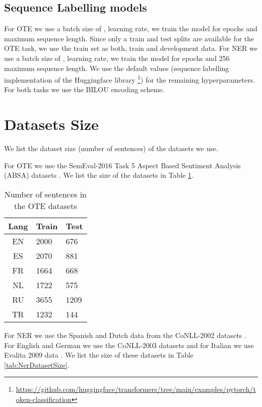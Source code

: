 \documentclass[11pt]{article}
\begin{document}
\subsection{Sequence Labelling models}\label{sec:appendix-models}
For OTE we use a batch size of ,  learning rate, we train the model for  epochs and  maximum sequence length. Since only a train and test splits are available for the OTE task, we use the train set as both, train and development data. 
For NER we use a batch size of ,  learning rate, we train the model for  epochs and 256 maximum sequence length. We use the default values (sequence labelling implementation of the Huggingface library \footnote{\url{https://github.com/huggingface/transformers/tree/main/examples/pytorch/token-classification}}) for the remaining hyperparameters. 
For both tasks we use the BILOU encoding scheme. 

\section{Datasets Size}\label{sec:appendix-datasets}

We list the dataset size (number of sentences) of the datasets we use. 

For OTE we use the SemEval-2016 Task 5 Aspect Based Sentiment Analysis (ABSA) datasets \cite{pontiki-etal-2016-semeval}. We list the size of the datasets in Table \ref{tab:OteDatasetSize}.

\begin{table}[htbp]
    \centering
\begin{tabular}{c|ll}
Lang & Train & Test \\
\hline
EN & 2000 & 676 \\
ES & 2070 & 881 \\
FR & 1664 & 668 \\
NL & 1722 & 575 \\
RU & 3655 & 1209 \\
TR & 1232 & 144 \\
\end{tabular}
    \caption{Number of sentences in the OTE datasets}
    \label{tab:OteDatasetSize}
\end{table}

For NER we use the Spanish and Dutch data from the CoNLL-2002 datasets \cite{tjong-kim-sang-2002-introduction}. For English and German we use the CoNLL-2003 datasets \cite{tjong-kim-sang-de-meulder-2003-introduction} and for Italian we use Evalita 2009 data \cite{speranza2009named}. We list the size of these datasets in Table \ref{tab:NerDatasetSize}.
\end{document}
